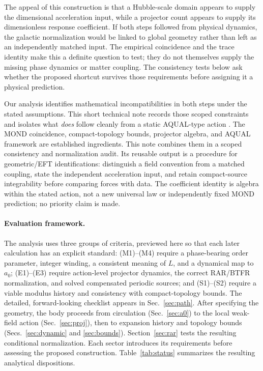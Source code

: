\documentclass[aps,prd,reprint,superscriptaddress,nofootinbib,floatfix,showkeys]{revtex4-2}
\newcommand{\azero}{a_{0}}
\begin{document}
The appeal of this construction is that a Hubble-scale domain appears to
supply the dimensional acceleration input, while a projector count appears
to supply its dimensionless response coefficient.  If both steps followed
from physical dynamics, the galactic normalization would be linked to global
geometry rather than left as an independently matched input.  The empirical
coincidence and the trace identity make this a definite question to test;
they do not themselves supply the missing phase dynamics or matter coupling.
The consistency tests below ask whether the proposed shortcut survives those
requirements before assigning it a physical prediction.

Our analysis identifies mathematical incompatibilities in both steps under the
stated assumptions.  This short technical note records those scoped
constraints and isolates what \emph{does} follow cleanly from a static
AQUAL-type action \cite{bekenstein_milgrom}.
The MOND coincidence, compact-topology bounds, projector algebra, and AQUAL
framework are established ingredients. This note combines them in a scoped
consistency and normalization audit. Its reusable output is a procedure for
geometric/EFT identifications: distinguish a field convention from a matched
coupling, state the independent acceleration input, and retain compact-source
integrability before comparing forces with data. The coefficient identity is
algebra within the stated action, not a new universal law or independently
fixed MOND prediction; no priority claim is made.

\paragraph{Evaluation framework.}
The analysis uses three groups of criteria, previewed here so that each later
calculation has an explicit standard: (M1)--(M4) require a phase-bearing order
parameter, integer winding, a consistent meaning of \(L\), and a dynamical map
to \(\azero\); (E1)--(E3) require action-level projector dynamics, the correct
RAR/BTFR normalization, and solved compensated periodic sources; and
(S1)--(S2) require a viable modulus history and consistency with
compact-topology bounds.
The detailed, forward-looking checklist appears in Sec.~\ref{sec:path}.
After specifying the geometry, the body proceeds from circulation
(Sec.~\ref{sec:a0}) to the local weak-field action
(Sec.~\ref{sec:proj}), then to expansion history and topology bounds
(Secs.~\ref{sec:dynamic} and \ref{sec:bounds}).  Section~\ref{sec:rar}
tests the resulting conditional normalization.  Each sector introduces its
requirements before assessing the proposed construction.
Table~\ref{tab:status} summarizes the resulting analytical dispositions.
\end{document}
